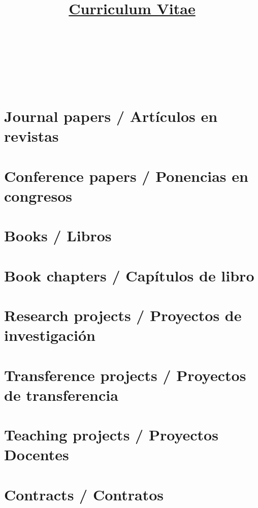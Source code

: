\documentclass{article}
\title{\href{https://github.com/vicente-gonzalez-ruiz/ridiculum}{Curriculum Vitae}}
\author{
  \begin{tabular}{c}
      \\
    ~\\
     \\
     \\
     \\
    ~\\
     \\
    
  \end{tabular}
}
\begin{document}
\maketitle

\tableofcontents

\renewcommand{\refname}{}
\section{Journal papers / Artículos en revistas}


\renewcommand{\refname}{}
\section{Conference papers / Ponencias en congresos}


\renewcommand{\refname}{}
\section{Books / Libros}


\renewcommand{\refname}{}
\section{Book chapters / Capítulos de libro}


\renewcommand{\refname}{}
\section{Research projects / Proyectos de investigación}


\renewcommand{\refname}{}
\section{Transference projects / Proyectos de transferencia}


\renewcommand{\refname}{}
\section{Teaching projects / Proyectos Docentes}


\renewcommand{\refname}{}
\section{Contracts / Contratos}

\end{document}
